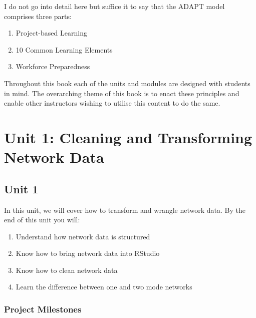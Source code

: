 \documentclass[
  letterpaper,
  DIV=11,
  numbers=noendperiod]{scrreprt}
\begin{document}
I do not go into detail here but suffice it to say that the ADAPT model
comprises three parts:

\begin{enumerate}
\def\labelenumi{\arabic{enumi}.}
\item
  Project-based Learning
\item
  10 Common Learning Elements
\item
  Workforce Preparedness
\end{enumerate}

Throughout this book each of the units and modules are designed with
students in mind. The overarching theme of this book is to enact these
principles and enable other instructors wishing to utilise this content
to do the same.

\part{Unit 1: Cleaning and Transforming Network Data}

\chapter{Unit 1}\label{unit-1}

In this unit, we will cover how to transform and wrangle network data.
By the end of this unit you will:

\begin{enumerate}
\def\labelenumi{\arabic{enumi}.}
\item
  Understand how network data is structured
\item
  Know how to bring network data into RStudio
\item
  Know how to clean network data
\item
  Learn the difference between one and two mode networks
\end{enumerate}

\section{Project Milestones}\label{project-milestones}
\end{document}
